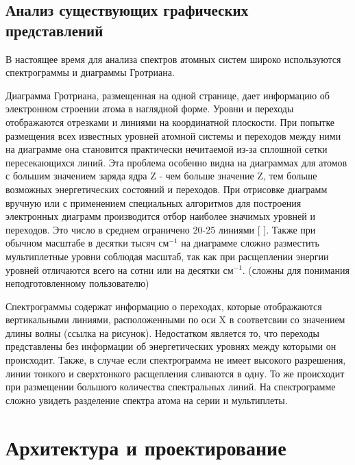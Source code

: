 \documentclass[a4paper, 12pt]{article}
\let\stdsection\section
\renewcommand\section{\newpage\stdsection}
\begin{document}
    \subsection{Анализ существующих графических представлений}
    В настоящее время для анализа спектров атомных систем широко используются спектрограммы и диаграммы Гротриана.\par
    Диаграмма Гротриана, размещенная на одной странице, дает информацию об электронном строении атома в наглядной форме. Уровни и переходы отображаются отрезками и линиями на координатной плоскости. При попытке размещения всех известных уровней атомной системы и переходов между ними на диаграмме она становится практически нечитаемой из-за сплошной сетки пересекающихся линий. Эта проблема особенно видна на диаграммах для атомов с большим значением заряда ядра Z - чем больше значение Z, тем больше возможных энергетических состояний и переходов. При отрисовке диаграмм вручную или с применением специальных алгоритмов для построения электронных диаграмм производится отбор наиболее значимых уровней и переходов. Это число в среднем ограничено 20-25 линиями [ ]. Также при обычном масштабе в десятки тысяч см$^{-1}$ на диаграмме сложно разместить мультиплетные уровни соблюдая масштаб, так как при расщеплении энергии уровней отличаются всего на сотни или на десятки см$^{-1}$. (сложны для понимания неподготовленному пользователю)\par
    Спектрограммы содержат информацию о переходах, которые отображаются вертикальными линиями, расположенными по оси X в соответсвии со значением длины волны (ссылка на рисунок). Недостатком является то, что переходы представлены без информации об энергетических уровнях между которыми он происходит. Также, в случае если спектрограмма не имеет высокого разрешения, линии тонкого и сверхтонкого расщепления сливаются в одну. То же происходит при размещении большого количества спектральных линий. На спектрограмме сложно увидеть разделение спектра атома на серии и мультиплеты.
\section{Архитектура и проектирование}
\end{document}
